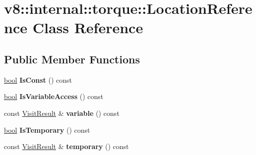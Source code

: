 \hypertarget{classv8_1_1internal_1_1torque_1_1LocationReference}{}\section{v8\+:\+:internal\+:\+:torque\+:\+:Location\+Reference Class Reference}
\label{classv8_1_1internal_1_1torque_1_1LocationReference}
\subsection*{Public Member Functions}
\begin{DoxyCompactItemize}
\item 
\mbox{\label{classv8_1_1internal_1_1torque_1_1LocationReference_a29fbd93f27d4f5b27aac8e2f05d20ebc}} 
\mbox{\hyperlink{classbool}{bool}} {\bfseries Is\+Const} () const
\item 
\mbox{\label{classv8_1_1internal_1_1torque_1_1LocationReference_a667c07d892f01d339f87b6a2bce07046}} 
\mbox{\hyperlink{classbool}{bool}} {\bfseries Is\+Variable\+Access} () const
\item 
\mbox{\label{classv8_1_1internal_1_1torque_1_1LocationReference_a4e67a72b412abb4786d5559f9092c198}} 
const \mbox{\hyperlink{classv8_1_1internal_1_1torque_1_1VisitResult}{Visit\+Result}} \& {\bfseries variable} () const
\item 
\mbox{\label{classv8_1_1internal_1_1torque_1_1LocationReference_aa03f6aef04b279dca01538b27714e3f6}} 
\mbox{\hyperlink{classbool}{bool}} {\bfseries Is\+Temporary} () const
\item 
\mbox{\label{classv8_1_1internal_1_1torque_1_1LocationReference_a8a2f9908a9fb282fbe387d931cd6e4d7}} 
const \mbox{\hyperlink{classv8_1_1internal_1_1torque_1_1VisitResult}{Visit\+Result}} \& {\bfseries temporary} () const
\item 
\mbox{\label{classv8_1_1internal_1_1torque_1_1LocationReference_a23c2092a9a410e9787a45c4573d42baa}} 

\end{DoxyCompactItemize}
